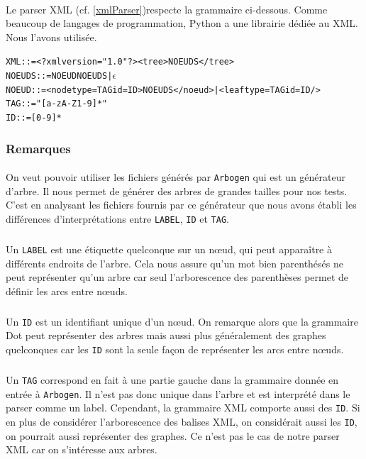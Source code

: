 \paragraph{}Le parser XML (cf. \ref{xmlParser})respecte la grammaire ci-dessous. Comme beaucoup de langages de programmation, Python a une librairie dédiée au XML. Nous l'avons utilisée.
		
\begin{alltt}
XML ::= <?xml version="1.0"?><tree> NOEUDS </tree>
NOEUDS ::= NOEUD NOEUDS | \( \epsilon \)
NOEUD ::= <node type=TAG id=ID> NOEUDS </noeud> | <leaf type=TAG id=ID />
TAG ::= " [a-zA-Z1-9]* "
ID ::= [0-9]*
\end{alltt}

		\subsubsection*{Remarques}

\paragraph{} On veut pouvoir utiliser les fichiers générés par \verb|Arbogen| \cite{REF_Arbogen} qui est un générateur d'arbre. Il nous permet de générer des arbres de grandes tailles pour nos tests. C'est en analysant les fichiers fournis par ce générateur que nous avons établi les différences d'interprétations entre \verb|LABEL|, \verb|ID| et \verb|TAG|.

\subparagraph{}Un \verb|LABEL| est une étiquette quelconque sur un n\oe ud, qui peut apparaître à différents endroits de l'arbre. Cela nous assure qu'un mot bien parenthésés ne peut représenter qu'un arbre car seul l'arborescence des parenthèses permet de définir les arcs entre n\oe uds.

\subparagraph{}Un \verb|ID| est un identifiant unique d'un n\oe ud. On remarque alors que la grammaire Dot peut représenter des arbres mais aussi plus généralement des graphes quelconques car les \verb|ID| sont la seule façon de représenter les arcs entre n\oe uds.

\subparagraph{}Un \verb|TAG| correspond en fait à une partie gauche dans la grammaire donnée en entrée à \verb|Arbogen|. Il n'est pas donc unique dans l'arbre et est interprété dans le parser comme un label. Cependant, la grammaire XML comporte aussi des \verb|ID|. Si en plus de considérer l'arborescence des balises XML, on considérait aussi les \verb|ID|, on pourrait aussi représenter des graphes. Ce n'est pas le cas de notre parser XML car on s'intéresse aux arbres.


